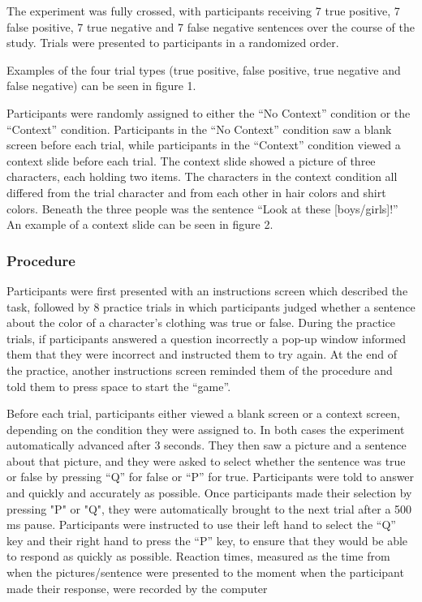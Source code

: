 \documentclass[10pt,letterpaper]{article}
\begin{document}
The experiment was fully crossed, with participants receiving 7 true positive, 7 false positive, 7 true negative and 7 false negative sentences over the course of the study.  Trials were presented to participants in a randomized order.

Examples of the four trial types (true positive, false positive, true negative and false negative) can be seen in figure 1.    

Participants were randomly assigned to either the ``No Context'' condition or the ``Context'' condition.  Participants in the ``No Context'' condition saw a blank screen before each trial, while participants in the ``Context'' condition viewed a context slide before each trial.  The context slide showed a picture of three characters, each holding two items.  The characters in the context condition all differed from the trial character and from each other in hair colors and shirt colors.  Beneath the three people was the sentence ``Look at these [boys/girls]!''  An example of a context slide can be seen in figure 2.  


\subsubsection{Procedure}

Participants were first presented with an instructions screen which described the task, followed by 8 practice trials in which participants judged whether a sentence about the color of a character's clothing was true or false.  During the practice trials, if participants answered a question incorrectly a pop-up window informed them that they were incorrect and instructed them to try again.  At the end of the practice, another instructions screen reminded them of the procedure and told them to press space to start the ``game''.  

Before each trial, participants either viewed a blank screen or a context screen, depending on the condition they were assigned to.  In both cases the experiment automatically advanced after 3 seconds.  They then saw a picture and a sentence about that picture, and they were asked to select whether the sentence was true or false by pressing ``Q'' for false or ``P'' for true.  Participants were told to answer and quickly and accurately as possible.  Once participants made their selection by pressing "P" or "Q", they were automatically brought to the next trial after a 500 ms pause.  Participants were instructed to use their left hand to select the ``Q'' key and their right hand to press the ``P'' key, to ensure that they would be able to respond as quickly as possible.  Reaction times, measured as the time from when the pictures/sentence were presented to the moment when the participant made their response, were recorded by the computer 
\end{document}
